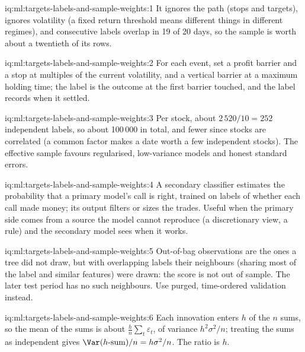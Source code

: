 \begin{solution}{iq:ml:targets-labels-and-sample-weights:1}
It ignores the path (stops and targets), ignores volatility (a fixed return threshold means different things in
different regimes), and consecutive labels overlap in 19 of 20 days, so the sample is worth about a twentieth of its
rows.
\end{solution}

\begin{solution}{iq:ml:targets-labels-and-sample-weights:2}
For each event, set a profit barrier and a stop at multiples of the current volatility, and a vertical barrier at a
maximum holding time; the label is the outcome at the first barrier touched, and the label records when it settled.
\end{solution}

\begin{solution}{iq:ml:targets-labels-and-sample-weights:3}
Per stock, about $2\,520/10 = 252$ independent labels, so about 100\,000 in total, and fewer since stocks are correlated
(a common factor makes a date worth a few independent stocks). The effective sample favours regularised, low-variance
models and honest standard errors.
\end{solution}

\begin{solution}{iq:ml:targets-labels-and-sample-weights:4}
A secondary classifier estimates the probability that a primary model's call is right, trained on labels of whether
each call made money; its output filters or sizes the trades. Useful when the primary side comes from a source the
model cannot reproduce (a discretionary view, a rule) and the secondary model sees when it works.
\end{solution}

\begin{solution}{iq:ml:targets-labels-and-sample-weights:5}
Out-of-bag observations are the ones a tree did not draw, but with overlapping labels their neighbours (sharing most of
the label and similar features) were drawn: the score is not out of sample. The later test period has no such
neighbours. Use purged, time-ordered validation instead.
\end{solution}

\begin{solution}{iq:ml:targets-labels-and-sample-weights:6}
Each innovation enters $h$ of the $n$ sums, so the mean of the sums is about $\frac hn\sum_t\varepsilon_t$, of variance
$h^2\sigma^2/n$; treating the sums as independent gives $\Var(h\text{-sum})/n = h\sigma^2/n$. The ratio is $h$.
\end{solution}
